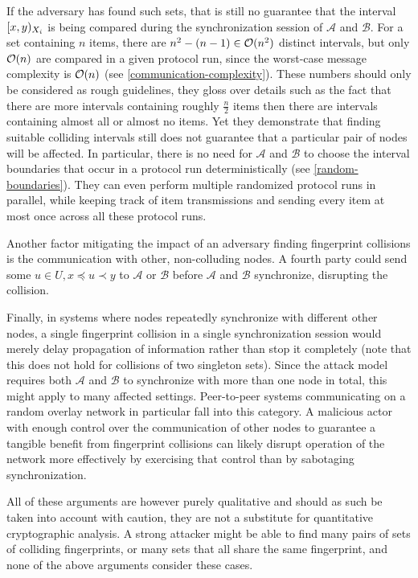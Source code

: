 If the adversary has found such sets, that is still no guarantee that the interval $[{x},{y})_{X_i}$ is being compared during the synchronization session of $\mathcal{A}$ and $\mathcal{B}$. For a set containing $n$ items, there are $n^2 - (n - 1) \in \mathcal{O}(n^2)$ distinct intervals, but only $\mathcal{O}(n)$ are compared in a given protocol run, since the worst-case message complexity is $\mathcal{O}(n)$ (see \cref{communication-complexity}). These numbers should only be considered as rough guidelines, they gloss over details such as the fact that there are more intervals containing roughly $\frac{n}{2}$ items then there are intervals containing almost all or almost no items. Yet they demonstrate that finding suitable colliding intervals still does not guarantee that a particular pair of nodes will be affected. In particular, there is no need for $\mathcal{A}$ and $\mathcal{B}$ to choose the interval boundaries that occur in a protocol run deterministically (see \cref{random-boundaries}). They can even perform multiple randomized protocol runs in parallel, while keeping track of item transmissions and sending every item at most once across all these protocol runs.

Another factor mitigating the impact of an adversary finding fingerprint collisions is the communication with other, non-colluding nodes. A fourth party could send some $u \in U, x \preceq u \prec y$ to $\mathcal{A}$ or $\mathcal{B}$ before $\mathcal{A}$ and $\mathcal{B}$ synchronize, disrupting the collision.

Finally, in systems where nodes repeatedly synchronize with different other nodes, a single fingerprint collision in a single synchronization session would merely delay propagation of information rather than stop it completely (note that this does not hold for collisions of two singleton sets). Since the attack model requires both $\mathcal{A}$ and $\mathcal{B}$ to synchronize with more than one node in total, this might apply to many affected settings. Peer-to-peer systems communicating on a random overlay network in particular fall into this category. A malicious actor with enough control over the communication of other nodes to guarantee a tangible benefit from fingerprint collisions can likely disrupt operation of the network more effectively by exercising that control than by sabotaging synchronization.

All of these arguments are however purely qualitative and should as such be taken into account with caution, they are not a substitute for quantitative cryptographic analysis. A strong attacker might be able to find many pairs of sets of colliding fingerprints, or many sets that all share the same fingerprint, and none of the above arguments consider these cases.

